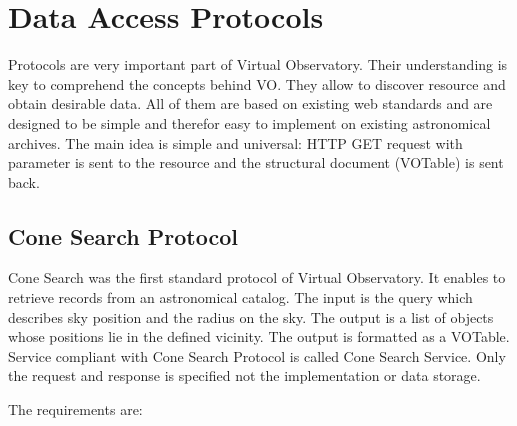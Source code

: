 


\section{Data Access Protocols}

Protocols are very important part of Virtual Observatory. Their
understanding is key to comprehend the concepts behind VO. They allow
to discover resource and obtain desirable data. All of them are based
on existing web standards and are designed to be simple and therefor
easy to implement on existing astronomical archives. The main idea is
simple and universal: HTTP GET request with parameter is sent to the
resource and the structural document (VOTable) is sent back.

\subsection{Cone Search Protocol} \label{sec:csp}
Cone Search was the first standard protocol of Virtual Observatory. It
enables to retrieve records from an astronomical catalog. The input is
the query which describes sky position and the radius on the sky. The
output is a list of objects whose positions lie in the defined
vicinity. The output is formatted as a VOTable. Service compliant with
Cone Search Protocol is called Cone Search Service. Only the request
and response is specified not the implementation or data storage.


The requirements are:


